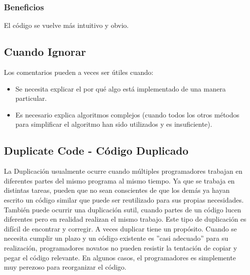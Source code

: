 \documentclass[11pt,a4paper,oneside]{book}
\begin{document}
\subsubsection{Beneficios}
El código se vuelve más intuitivo y obvio.
\subsection{Cuando Ignorar}
Los comentarios pueden a veces ser útiles cuando:
\begin{itemize}
    \item Se necesita explicar el por qué algo está implementado de una manera particular.
    \item Es necesario explica algoritmos complejos (cuando todos los otros métodos para simplificar el algoritmo han sido utilizados y es insuficiente).
\end{itemize}
    
\subsection{Duplicate Code - Código Duplicado}
\label{duplicateCode}
La Duplicación usualmente ocurre cuando múltiples programadores trabajan en diferentes partes del mismo programa al mismo tiempo. Ya que se trabaja en distintas tareas, pueden que no sean conscientes de que los demás ya hayan escrito un código similar que puede ser reutilizado para sus propias necesidades.
\newline
También puede ocurrir una duplicación sutil, cuando partes de un código lucen diferentes pero en realidad realizan el mismo trabajo. Este tipo de duplicación es difícil de encontrar y corregir.
\newline
A veces duplicar tiene un propósito. Cuando se necesita cumplir un plazo y un código existente es ''casi adecuado'' para su realización, programadores novatos no pueden resistir la tentación de copiar y pegar el código relevante. En algunos casos, el programadores es simplemente muy perezoso para reorganizar el código.
\end{document}
